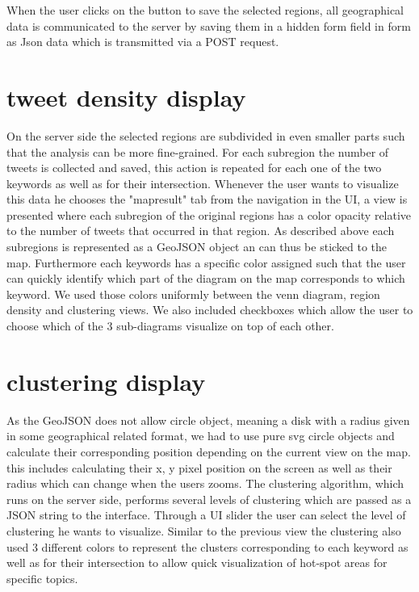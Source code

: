 When the user clicks on the button to save the selected regions, all geographical data is communicated to the server by saving them in a hidden form field in form as Json data which is transmitted via a POST request.


\section{tweet density display}

On the server side the selected regions are subdivided in even smaller parts such that the analysis can be more fine-grained. For each subregion the number of tweets is collected and saved, this action is repeated for each one of the two keywords as well as for their intersection.
Whenever the user wants to visualize this data he chooses the "mapresult" tab from the navigation in the UI, a view is presented where each subregion of the original regions has a color opacity relative to the number of tweets that occurred in that region. As described above each subregions is represented as a GeoJSON object an can thus be sticked to the map. Furthermore each keywords has a specific color assigned such that the user can quickly identify which part of the diagram on the map corresponds to which keyword. We used those colors uniformly between the venn diagram, region density and clustering views. We also included checkboxes which allow the user to choose which of the 3 sub-diagrams visualize on top of each other.


\section{clustering display}

As the GeoJSON does not allow circle object, meaning a disk with a radius given in some geographical related format, we had to use pure svg circle objects and calculate their corresponding position depending on the current view on the map. this includes calculating their x, y pixel position on the screen as well as their radius which can change when the users zooms. The clustering algorithm, which runs on the server side, performs several levels of clustering which are passed as a JSON string to the interface. Through a UI slider the user can select the level of clustering he wants to visualize. Similar to the previous view the clustering also used 3 different colors to represent the clusters corresponding to each keyword as well as for their intersection to allow quick visualization of hot-spot areas for specific topics.

